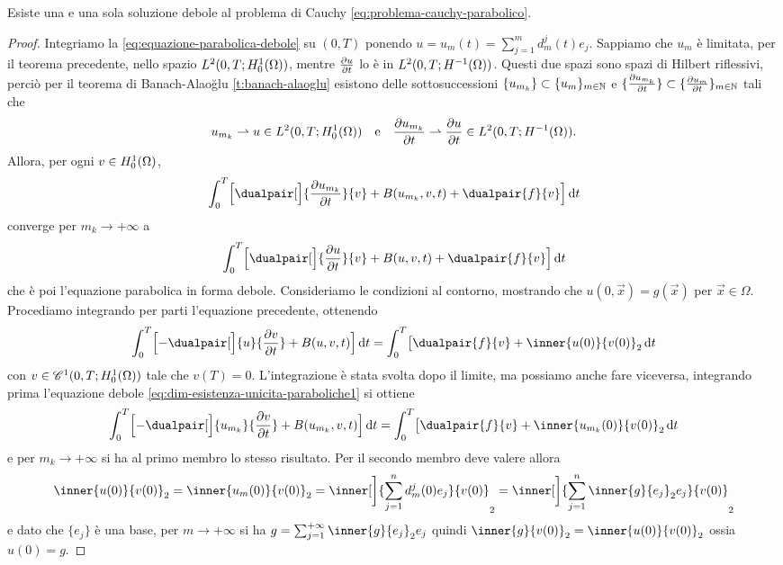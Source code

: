 \begin{teorema} \label{t:esistenza-unicita-paraboliche}
    Esiste una e una sola soluzione debole al problema di Cauchy \eqref{eq:problema-cauchy-parabolico}.
\end{teorema}
\begin{proof}
    Integriamo la \eqref{eq:equazione-parabolica-debole} su $(0,T)$ ponendo $u=u_m(t)=\sum_{j=1}^md^j_m(t)e_j$.
    Sappiamo che $u_m$ è limitata, per il teorema precedente, nello spazio $\leb[2]{0,T;\sobHc[1]{\Omega}}$, mentre $\drp{u}{t}$ lo è in $\leb[2]{0,T;\sobH[-1]{\Omega}}$.
    Questi due spazi sono spazi di Hilbert riflessivi, perciò per il teorema di Banach-Alao\u{g}lu \ref{t:banach-alaoglu} esistono delle sottosuccessioni $\{u_{m_k}\}\subset\{u_m\}_{m\in\N}$ e $\{\drp{u_{m_k}}{t}\}\subset\{\drp{u_m}{t}\}_{m\in\N}$ tali che
    \begin{equation*}
        u_{m_k}\weakto u\in\leb[2]{0,T;\sobHc[1]{\Omega}}
        \qtext{e}
        \drp{u_{m_k}}{t}\weakto\drp{u}{t}\in\leb[2]{0,T;\sobH[-1]{\Omega}}.
    \end{equation*}
    Allora, per ogni $v\in\sobHc[1]{\Omega}$,
    \begin{equation}
        \int_0^T\Bigl[\dualpair[\Big]{\drp{u_{m_k}}{t}}{v}+B(u_{m_k},v,t)+\dualpair{f}{v}\Bigr]\,\dd t
        \label{eq:dim-esistenza-unicita-paraboliche1}
    \end{equation}
    converge per $m_k\to+\infty$ a
    \begin{equation}
        \int_0^T\Bigl[\dualpair[\Big]{\drp{u}{t}}{v}+B(u,v,t)+\dualpair{f}{v}\Bigr]\,\dd t
    \end{equation}
    che è poi l'equazione parabolica in forma debole.
    Consideriamo le condizioni al contorno, mostrando che $u(0,\vec x)=g(\vec x)$ per $\vec x\in\Omega$.
    Procediamo integrando per parti l'equazione precedente, ottenendo
    \begin{equation}
        \int_0^T\Bigl[-\dualpair[\Big]{u}{\drp{v}{t}}+B(u,v,t)\Bigr]\,\dd t=
        \int_0^T\bigl[\dualpair{f}{v}+\inner{u(0)}{v(0)}_2\,\dd t
    \end{equation}
    con $v\in\cont[1]{0,T;\sobHc[1]{\Omega}}$ tale che $v(T)=0$.
    L'integrazione è stata svolta dopo il limite, ma possiamo anche fare viceversa, integrando prima l'equazione debole \eqref{eq:dim-esistenza-unicita-paraboliche1} si ottiene
    \begin{equation}
        \int_0^T\Bigl[-\dualpair[\Big]{u_{m_k}}{\drp{v}{t}}+B(u_{m_k},v,t)\Bigr]\,\dd t=
        \int_0^T\bigl[\dualpair{f}{v}+\inner{u_{m_k}(0)}{v(0)}_2\,\dd t
    \end{equation}
    e per $m_k\to+\infty$ si ha al primo membro lo stesso risultato.
    Per il secondo membro deve valere allora
    \begin{equation}
        \inner{u(0)}{v(0)}_2=
        \inner{u_m(0)}{v(0)}_2=
        \inner[\bigg]{\sum_{j=1}^nd^j_m(0)e_j}{v(0)}_2=
        \inner[\bigg]{\sum_{j=1}^n\inner{g}{e_j}_2e_j}{v(0)}_2
    \end{equation}
    e dato che $\{e_j\}$ è una base, per $m\to+\infty$ si ha $g=\sum_{j=1}^{+\infty}\inner{g}{e_j}_2e_j$ quindi $\inner{g}{v(0)}_2=\inner{u(0)}{v(0)}_2$ ossia $u(0)=g$.


\end{proof}
